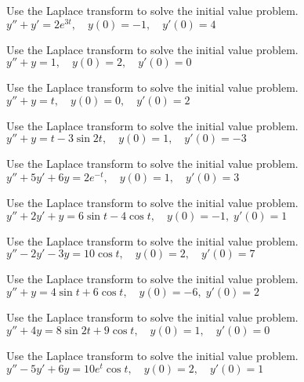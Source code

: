 \documentclass{ximera}
\begin{document}
\begin{problem}\label{exer:8.3.18} Use the Laplace transform to solve the initial value problem. $y''+y'=2e^{3t}, \quad  y(0)=-1,\quad y'(0)=4$
\end{problem}

\begin{problem}\label{exer:8.3.19} Use the Laplace transform to solve the initial value problem. $y''+y=1, \quad  y(0)=2,\quad y'(0)=0$
\end{problem}

\begin{problem}\label{exer:8.3.20} Use the Laplace transform to solve the initial value problem. $y''+y=t, \quad  y(0)=0,\quad y'(0)=2$
\end{problem}

\begin{problem}\label{exer:8.3.21} Use the Laplace transform to solve the initial value problem. $y''+y=t-3\sin2t, \quad  y(0)=1,\quad y'(0)=-3$
\end{problem}

\begin{problem}\label{exer:8.3.22} Use the Laplace transform to solve the initial value problem. $y''+5y'+6y=2e^{-t}, \quad  y(0)=1,\quad y'(0)=3$
\end{problem}

\begin{problem}\label{exer:8.3.23} Use the Laplace transform to solve the initial value problem. $y''+2y'+y=6\sin t-4\cos t, \quad  y(0)=-1,\;
y'(0)=1$
\end{problem}

\begin{problem}\label{exer:8.3.24} Use the Laplace transform to solve the initial value problem. $y''-2y'-3y=10\cos t, \quad  y(0)=2,\quad y'(0)=7$
\end{problem}

\begin{problem}\label{exer:8.3.25} Use the Laplace transform to solve the initial value problem. $y''+y=4\sin t+6\cos t, \quad  y(0)=-6,\;
y'(0)=2$
\end{problem}

\begin{problem}\label{exer:8.3.26} Use the Laplace transform to solve the initial value problem.  $y''+4y=8\sin2t+9\cos t, \quad  y(0)=1,\quad y'(0)=0$
\end{problem}

\begin{problem}\label{exer:8.3.27} Use the Laplace transform to solve the initial value problem. $y''-5y'+6y=10e^t\cos t, \quad  y(0)=2,\quad y'(0)=1$
\end{problem}
\end{document}
